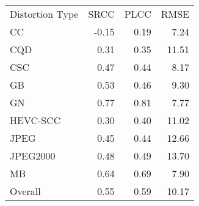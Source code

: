 \begin{tabular}{lrrr}
Distortion Type & SRCC & PLCC & RMSE \\
CC & -0.15 & 0.19 & 7.24 \\
CQD & 0.31 & 0.35 & 11.51 \\
CSC & 0.47 & 0.44 & 8.17 \\
GB & 0.53 & 0.46 & 9.30 \\
GN & 0.77 & 0.81 & 7.77 \\
HEVC-SCC & 0.30 & 0.40 & 11.02 \\
JPEG & 0.45 & 0.44 & 12.66 \\
JPEG2000 & 0.48 & 0.49 & 13.70 \\
MB & 0.64 & 0.69 & 7.90 \\
Overall & 0.55 & 0.59 & 10.17 \\
\end{tabular}
